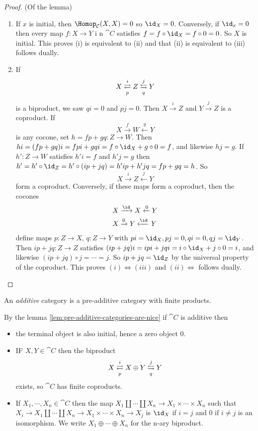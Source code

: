 \documentclass[../main.tex]{subfiles}
\begin{document}
\begin{proof}(Of the lemma)
	\begin{enumerate}
    	\item If $x$ is initial, then $\Hom_{\cat C}(X, X) = 0$ so $\id_X = 0$.
		Conversely, if $\id_x = 0$ then every map $f: X \to Y$ i n $\cat C$ satisfies $f = f \circ \id_X = f \circ 0 = 0$. So $X$ is initial. This proves (i) is equivalent to (ii) and that (ii) is equivalent to (iii) follows dually.
		\item If \[X \xrightleftarrows{i}[p] Z \xleftrightarrows{j}[q] Y\] is a biproduct, we saw $qi = 0$ and $pj = 0$. Then $X \xrightarrow{i} Z$ and $Y \xrightarrow{j} Z$ is a coproduct. If \[X \xrightarrow{f} W \xleftarrow{g} Y\] is any cocone, set $h = fp + gq: Z \to W$. Then $hi = (fp + gq)i = fpi + gqi = f \circ \id_X + g \circ 0 = f$, and likewise $hj = g$. If $h': Z \to W$ satisfies $h'i = f$ and $h'j = g$ then $h' = h' \circ \id_Z = h' \circ (ip + jq) = h'ip + h'jq = fp + gq = h$. So \[X \xrightarrow{i} Z \xleftarrow{j} Y\] form a coproduct. Conversely, if these maps form a coproduct, then the cocones 
		\begin{align*}
        	&X \xrightarrow{\id} X \xleftarrow{0} Y\\
			&X \xrightarrow{0} Y \xleftarrow{\id} Y			
        \end{align*}
		 define maps $p: Z \to X$, $q: Z \to Y$ with $pi = \id_X, pj = 0, qi = 0, qj = \id_Y$. Then $ip + jq: Z \to Z$ satisfies $(ip + jq)i = ipi + jqi = i \circ \id_X + j \circ 0 = i$, and likewise $(ip + jq)\circ j = \cdots = j$. So $ip + jq = \id_Z$ by the universal property of the coproduct. This proves $(i) \Leftrightarrow (iii)$ and $(ii) \Leftrightarrow$ follows dually.
    \end{enumerate}
\end{proof}
\begin{defn}
	An \emph{additive} category is a pre-additive category with finite products.
\end{defn}
\begin{rmk}
	By the lemma \cref{lem:pre-additive-categories-are-nice} if $\cat C$ is additive then
	\begin{itemize}
    	\item the terminal object is also initial, hence a zero object $0$.
		\item IF $X, Y \in \cat C$ then the biproduct \[X \xrightleftarrows{i}[p] X \oplus Y \xleftrightarrows{j}[q] Y\] exists, so $\cat C$ has finite coproducts.
		\item If $X_1, \cdots, X_n \in \cat C$ then the map $X_1 \coprod \cdots \coprod X_n \to X_1 \times \cdots \times X_n$ such that $X_i \to X_1 \coprod \cdots \coprod X_n \to X_1 \times \cdots \times X_n \to X_j$ is $\id_X$ if $i = j$ and $0$ if $i \neq j$ is an isomorphism. We write $X_1 \oplus \cdots \oplus X_n$ for the n-ary biproduct.
    \end{itemize}

\end{rmk}
\end{document}
